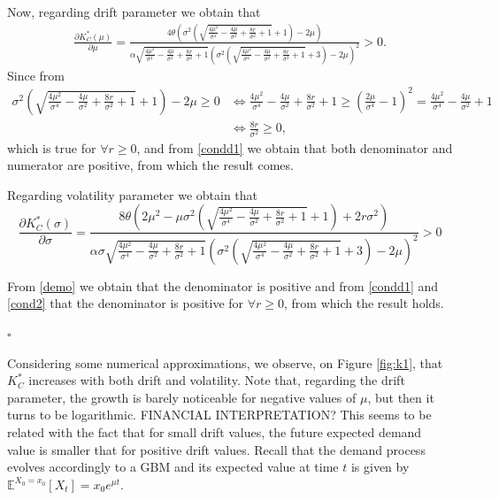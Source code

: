 Now, regarding drift parameter we obtain that
 \begin{align*}
\frac{\partial K^*_C(\mu)}{\partial \mu}=
\frac{4 \theta \left(\sigma ^2 \left(\sqrt{\frac{4 \mu ^2}{\sigma ^4}-\frac{4 \mu }{\sigma ^2}+\frac{8 r}{\sigma ^2}+1}+1\right)-2 \mu \right)}{\alpha \sqrt{\frac{4 \mu ^2}{\sigma ^4}-\frac{4 \mu }{\sigma ^2}+\frac{8 r}{\sigma ^2}+1} \left(\sigma ^2 \left(\sqrt{\frac{4 \mu ^2}{\sigma ^4}-\frac{4 \mu }{\sigma ^2}+\frac{8 r}{\sigma ^2}+1}+3\right)-2 \mu \right)^2}>0.
\end{align*}
Since from
\begin{align}
\label{cond2}
\sigma ^2 \left(\sqrt{\frac{4 \mu ^2}{\sigma ^4}-\frac{4 \mu }{\sigma ^2}+\frac{8 r}{\sigma ^2}+1}+1\right)-2 \mu\geq0 
& \Leftrightarrow
\frac{4 \mu ^2}{\sigma ^4}-\frac{4 \mu }{\sigma ^2}+\frac{8 r}{\sigma ^2}+1 \geq \left( \frac{2 \mu}{\sigma^4}-1 \right)^2=\frac{4 \mu ^2}{\sigma ^4}-\frac{4 \mu }{\sigma ^2}+1 \\
& \Leftrightarrow
\frac{8 r}{\sigma ^2}\geq 0, \nonumber
\end{align}
which is true for $\forall r\geq 0$, and from \eqref{condd1} we obtain that both denominator and numerator are positive, from which the result comes.

Regarding volatility parameter we obtain that
 $$    \frac{\partial K^*_C(\sigma)}{\partial \sigma}= 
\frac{8 \theta \left(2 \mu ^2-\mu  \sigma ^2 \left(\sqrt{\frac{4 \mu ^2}{\sigma ^4}-\frac{4 \mu }{\sigma ^2}+\frac{8 r}{\sigma ^2}+1}+1\right)+2 r \sigma ^2\right)}{\alpha \sigma  \sqrt{\frac{4 \mu ^2}{\sigma ^4}-\frac{4 \mu }{\sigma ^2}+\frac{8 r}{\sigma ^2}+1} \left(\sigma ^2 \left(\sqrt{\frac{4 \mu ^2}{\sigma ^4}-\frac{4 \mu }{\sigma ^2}+\frac{8 r}{\sigma ^2}+1}+3\right)-2 \mu \right)^2}>0$$

From \eqref{demo} we obtain that the denominator is positive and from \eqref{condd1} and \eqref{cond2} that the denominator is positive for $\forall r\geq0$, from which the result holds.
\begin{flushright}
	$\square$
\end{flushright}


Considering some numerical approximations, we observe, on Figure \ref{fig:k1}, that $K^*_C$ increases with both drift and volatility. Note that, regarding the drift parameter, the growth is barely noticeable for negative values of $\mu$, but then it turns to be logarithmic. FINANCIAL INTERPRETATION? This seems to be related with the fact that for small drift values, the future expected demand value is smaller that for positive drift values. Recall that the demand process evolves accordingly to a GBM and its expected value at time $t$ is given by $\mathds{E}^{X_0=x_0} [X_t]=x_0 e^{\mu t}$.

